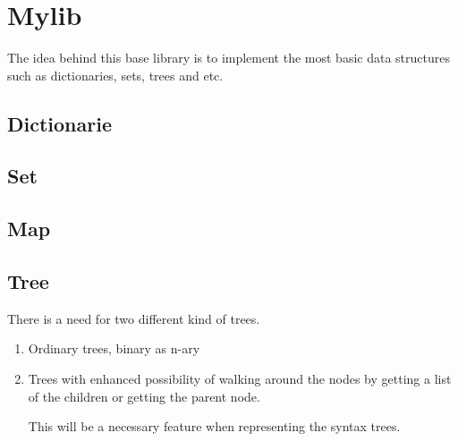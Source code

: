 \section*{Mylib}

The idea behind this base library is to implement the most basic data structures
such as dictionaries, sets, trees and etc. 

\subsection*{Dictionarie}

\subsection*{Set}

\subsection*{Map}

\subsection*{Tree}


There is a need for two different kind of trees.

\begin{enumerate}
\item Ordinary trees, binary as n-ary

\item Trees with enhanced possibility of walking around the nodes by getting
  a list of the children or getting the parent node.

This will be a necessary feature when representing the syntax trees.
\end{enumerate}




